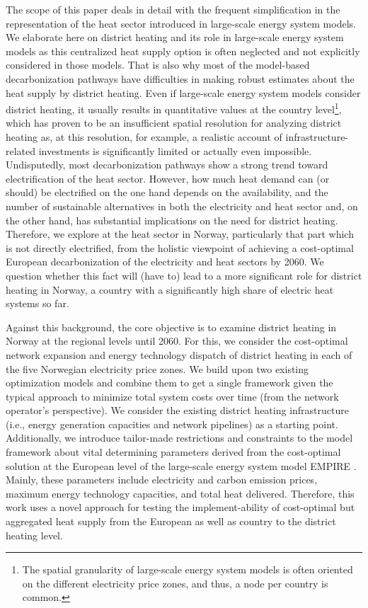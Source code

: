 The scope of this paper deals in detail with the frequent simplification in the representation of the heat sector introduced in large-scale energy system models. We elaborate here on district heating and its role in large-scale energy system models as this centralized heat supply option is often neglected and not explicitly considered in those models. That is also why most of the model-based decarbonization pathways have difficulties in making robust estimates about the heat supply by district heating. Even if large-scale energy system models consider district heating, it usually results in quantitative values at the country level\footnote{The spatial granularity of large-scale energy system models is often oriented on the different electricity price zones, and thus, a node per country is common.}, which has proven to be an insufficient spatial resolution for analyzing district heating as, at this resolution, for example, a realistic account of infrastructure-related investments is significantly limited or actually even impossible. Undisputedly, most decarbonization pathways show a strong trend toward electrification of the heat sector. However, how much heat demand can (or should) be electrified on the one hand depends on the availability, and the number of sustainable alternatives in both the electricity and heat sector and, on the other hand, has substantial implications on the need for district heating. Therefore, we explore at the heat sector in Norway, particularly that part which is not directly electrified, from the holistic viewpoint of achieving a cost-optimal European decarbonization of the electricity and heat sectors by 2060. We question whether this fact will (have to) lead to a more significant role for district heating in Norway, a country with a significantly high share of electric heat systems so far.\vspace{0.5cm}

Against this background, the core objective is to examine district heating in Norway at the regional levels until 2060. For this, we consider the cost-optimal network expansion and energy technology dispatch of district heating in each of the five Norwegian electricity price zones. We build upon two existing optimization models and combine them to get a single framework given the typical approach to minimize total system costs over time (from the network operator's perspective). We consider the existing district heating infrastructure (i.e., energy generation capacities and network pipelines) as a starting point. Additionally, we introduce tailor-made restrictions and constraints to the model framework about vital determining parameters derived from the cost-optimal solution at the European level of the large-scale energy system model EMPIRE \cite{backe2022empire}. Mainly, these parameters include electricity and carbon emission prices, maximum energy technology capacities, and total heat delivered. Therefore, this work uses a novel approach for testing the implement-ability of cost-optimal but aggregated heat supply from the European as well as country to the district heating level.\vspace{0.5cm}

